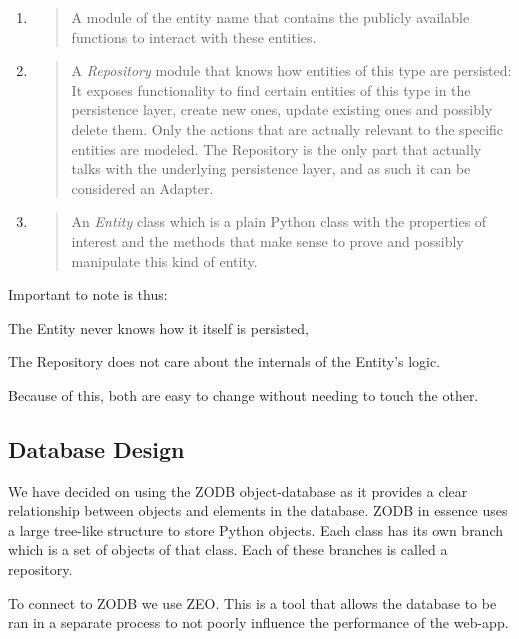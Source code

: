 \begin{enumerate}
\def\labelenumi{\arabic{enumi}.}
\item
  \begin{quote}
  A module of the entity name that contains the publicly available
  functions to interact with these entities.
  \end{quote}
\item
  \begin{quote}
  A \emph{Repository} module that knows how entities of this type are
  persisted: It exposes functionality to find certain entities of this
  type in the persistence layer, create new ones, update existing ones
  and possibly delete them. Only the actions that are actually relevant
  to the specific entities are modeled. The Repository is the only part
  that actually talks with the underlying persistence layer, and as such
  it can be considered an Adapter.
  \end{quote}
\item
  \begin{quote}
  An \emph{Entity} class which is a plain Python class with the
  properties of interest and the methods that make sense to prove and
  possibly manipulate this kind of entity.
  \end{quote}
\end{enumerate}

Important to note is thus:

The Entity never knows how it itself is persisted,

The Repository does not care about the internals of the Entity's logic.

Because of this, both are easy to change without needing to touch the
other.

\hypertarget{database-design}{%
\subsection{Database Design}\label{database-design}}

We have decided on using the ZODB object-database as it provides a clear
relationship between objects and elements in the database. ZODB in
essence uses a large tree-like structure to store Python objects. Each
class has its own branch which is a set of objects of that class. Each
of these branches is called a repository.

To connect to ZODB we use ZEO. This is a tool that allows the database
to be ran in a separate process to not poorly influence the performance
of the web-app.

